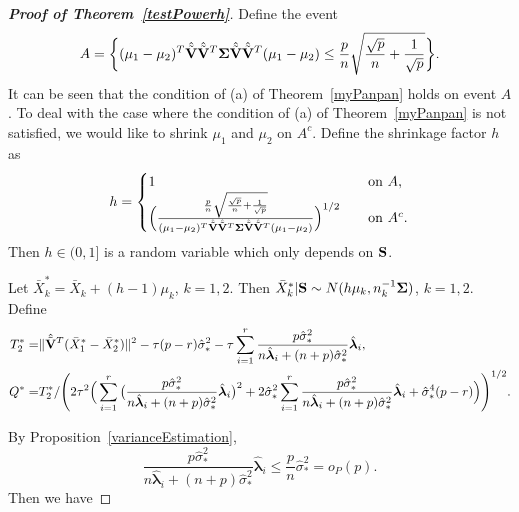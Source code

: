 \documentclass[3p]{elsarticle}
\newcommand{\bfsym}[1]{\ensuremath{\boldsymbol{#1}}}
\def\blambda {\bfsym {\lambda}}        \def\bLambda {\bfsym {\Lambda}}
\theoremstyle{plain}
\theoremstyle{definition}
\theoremstyle{remark}
\begin{document}
\begin{appendices}
\begin{proof}[\textbf{Proof of Theorem~\ref{testPowerh}}]
    Define the event
    $$
    A=\bigg\{
            (\mu_1-\mu_2)^T \hat{\tilde{\BV}}\hat{\tilde{\BV}}^T \bSigma \hat{\tilde{\BV}}\hat{\tilde{\BV}}^T(\mu_1-\mu_2)\leq
            \frac{p}{n}\sqrt{\frac{\sqrt{p}}{n}+\frac{1}{\sqrt{p}}}
        \bigg\}.
    $$
    It can be seen that the condition of (a) of Theorem~\ref{myPanpan} holds on event $A$.
    To deal with the case where the condition of (a) of Theorem~\ref{myPanpan} is not satisfied, we would like to shrink $\mu_1$ and $\mu_2$ on $A^c$.
    Define the shrinkage factor $h$ as
$$
    h=
        \begin{cases}
            1&\quad \text{on }  A,\\
            \Big( 
            \frac{
\frac{p}{n}\sqrt{\frac{\sqrt{p}}{n}+\frac{1}{\sqrt{p}}}
            }{(\mu_1-\mu_2)^T \hat{\tilde{\BV}}\hat{\tilde{\BV}}^T \bSigma \hat{\tilde{\BV}}\hat{\tilde{\BV}}^T(\mu_1-\mu_2) }
            \Big)^{1/2}
            &\quad \text{on }
            A^c
            .\\
        \end{cases}
$$
    Then $h\in (0,1]$ is a random variable which only depends on $\mathbf{S}$. 


    Let $\bar{X}_{k}^*=\bar{X}_k+(h-1)\mu_k$, $k=1,2$. Then $\bar{X}_k^*|\BS\sim N(h\mu_k,n_k^{-1}\bSigma)$, $k=1,2$.
    Define
    \begin{align*}
        T_2^*=&\|\hat{\tilde{\BV}}^T (\bar{X}_1^*-\bar{X}_2^*)\|^2
-
\tau(p-r)\hat{\sigma}_*^2 
- \tau\sum_{i=1}^r \frac{p\hat{\sigma}_*^2}{n\hat{\blambda}_i+(n+p)\hat{\sigma}_*^2}\hat{\blambda}_i,\\
        Q^*=&
T_2^*/
   \Bigg( 
        2\tau^2\Big(
        \sum_{i=1}^r \big(\frac{p\hat{\sigma}_*^2}{n\hat{\blambda}_i+(n+p)\hat{\sigma}_*^2}\hat{\blambda}_i\big)^2
    +
        2\hat{\sigma}_*^2\sum_{i=1}^r \frac{p\hat{\sigma}_*^2}{n\hat{\blambda}_i+(n+p)\hat{\sigma}_*^2}\hat{\blambda}_i
        +\hat{\sigma}_*^4 (p-r)
    \Big)\Bigg)^{1/2}.
    \end{align*}

By Proposition~\ref{varianceEstimation},
$$
\frac{p\hat{\sigma}_*^2}{n\hat{\blambda}_i+(n+p)\hat{\sigma}_*^2}\hat{\blambda}_i\leq
\frac{p}{n}\hat{\sigma}_*^2
=o_P(p).
$$
Then we have 


\end{proof}
\end{appendices}
\end{document}
